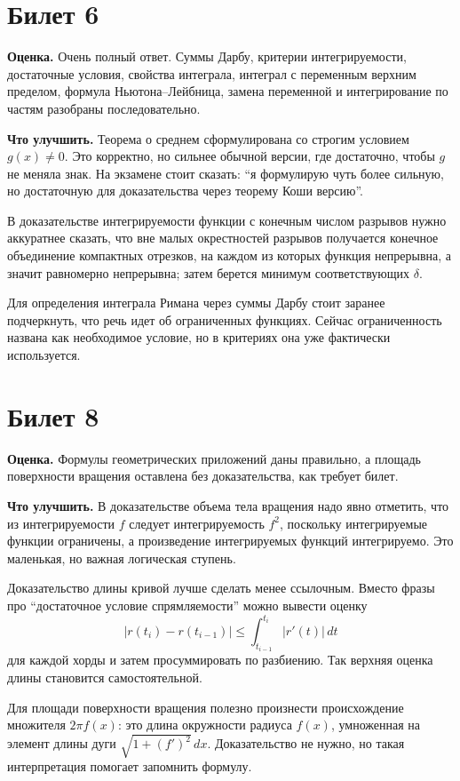 \documentclass[12pt,a4paper]{article}
\newcommand{\dd}{\,d}
\begin{document}
\section*{Билет 6}

\textbf{Оценка.} Очень полный ответ. Суммы Дарбу, критерии интегрируемости,
достаточные условия, свойства интеграла, интеграл с переменным верхним
пределом, формула Ньютона--Лейбница, замена переменной и интегрирование по
частям разобраны последовательно.

\textbf{Что улучшить.}
Теорема о среднем сформулирована со строгим условием \(g(x)\ne0\). Это
корректно, но сильнее обычной версии, где достаточно, чтобы \(g\) не меняла
знак. На экзамене стоит сказать: ``я формулирую чуть более сильную, но
достаточную для доказательства через теорему Коши версию''.

В доказательстве интегрируемости функции с конечным числом разрывов нужно
аккуратнее сказать, что вне малых окрестностей разрывов получается конечное
объединение компактных отрезков, на каждом из которых функция непрерывна, а
значит равномерно непрерывна; затем берется минимум соответствующих
\(\delta\).

Для определения интеграла Римана через суммы Дарбу стоит заранее подчеркнуть,
что речь идет об ограниченных функциях. Сейчас ограниченность названа как
необходимое условие, но в критериях она уже фактически используется.

\section*{Билет 8}

\textbf{Оценка.} Формулы геометрических приложений даны правильно, а площадь
поверхности вращения оставлена без доказательства, как требует билет.

\textbf{Что улучшить.}
В доказательстве объема тела вращения надо явно отметить, что из
интегрируемости \(f\) следует интегрируемость \(f^2\), поскольку
интегрируемые функции ограничены, а произведение интегрируемых функций
интегрируемо. Это маленькая, но важная логическая ступень.

Доказательство длины кривой лучше сделать менее ссылочным. Вместо фразы про
``достаточное условие спрямляемости'' можно вывести оценку
\[
  |r(t_i)-r(t_{i-1})|
  \le \int_{t_{i-1}}^{t_i}|r'(t)|\dd t
\]
для каждой хорды и затем просуммировать по разбиению. Так верхняя оценка
длины становится самостоятельной.

Для площади поверхности вращения полезно произнести происхождение множителя
\(2\pi f(x)\): это длина окружности радиуса \(f(x)\), умноженная на элемент
длины дуги \(\sqrt{1+(f')^2}\dd x\). Доказательство не нужно, но такая
интерпретация помогает запомнить формулу.
\end{document}

